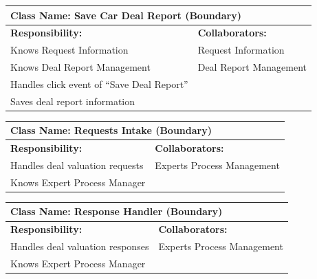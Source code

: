 \documentclass[]{article}
\begin{document}
\begin{table}[H]
  \centering
  \renewcommand{\arraystretch}{1.3} %
  \begin{tabular}{|p{7.5cm}|p{7.5cm}|}
    \hline
    \multicolumn{2}{|l|}{\textbf{Class Name: Save Car Deal Report (Boundary)}} \\
    \hline
    \textbf{Responsibility:}                  & \textbf{Collaborators:}        \\
    \hline
    Knows Request Information                 & Request Information            \\
    Knows Deal Report Management              & Deal Report Management         \\
    Handles click event of “Save Deal Report” &                                \\
    Saves deal report information             &                                \\
    \hline
  \end{tabular}
\end{table}
\begin{table}[H]
  \centering
  \renewcommand{\arraystretch}{1.3} %
  \begin{tabular}{|p{7.5cm}|p{7.5cm}|}
    \hline
    \multicolumn{2}{|l|}{\textbf{Class Name: Requests Intake (Boundary)}} \\
    \hline
    \textbf{Responsibility:}        & \textbf{Collaborators:}             \\
    \hline
    Handles deal valuation requests & Experts Process Management          \\
    Knows Expert Process Manager    &                                     \\
    \hline
  \end{tabular}
\end{table}
\begin{table}[H]
  \centering
  \renewcommand{\arraystretch}{1.3} %
  \begin{tabular}{|p{7.5cm}|p{7.5cm}|}
    \hline
    \multicolumn{2}{|l|}{\textbf{Class Name: Response Handler (Boundary)}} \\
    \hline
    \textbf{Responsibility:}         & \textbf{Collaborators:}             \\
    \hline
    Handles deal valuation responses & Experts Process Management          \\
    Knows Expert Process Manager     &                                     \\
    \hline
  \end{tabular}
\end{table}
\end{document}
